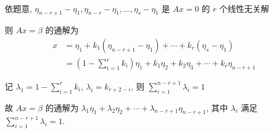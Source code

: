      \paragraph{} %
         依题意, \( \eta_{n-r+1}-\eta_{1}, \eta_{n-r}-\eta_{1}, \dots, \eta_{s}-\eta_{1} \) 是 \( Ax=0 \) 的 \( r \) 个线性无关解

         则 \( Ax=\beta \) 的通解为
         \begin{align*}
             x & = \eta_{1} + k_{1}(\eta_{n-r+1} - \eta_{1}) + \cdots + k_{r}(\eta_{s} - \eta_{1})                            \\
               & = \left(1 - \sum_{i=1}^{r} k_{i}\right)\eta_{1} + k_{1}\eta_{2} + k_{2}\eta_{3} + \cdots + k_{r}\eta_{n-r+1}
         \end{align*}

         记 \( \lambda_{1} = 1-\sum_{i=1}^{r}k_{i} \), \( \lambda_i=k_{r+2-i} \), 则 \(\sum_{i=1}^{n-r+1}\lambda_{i} = 1\)

         故 \( Ax=\beta \) 的通解为 \( \lambda_{1}\eta_{1} + \lambda_{2}\eta_{2} + \cdots + \lambda_{n-r+1}\eta_{n-r+1} \), 其中 \( \lambda_{i} \) 满足 \( \sum_{i=1}^{n-r+1}\lambda_{i} = 1 \).
